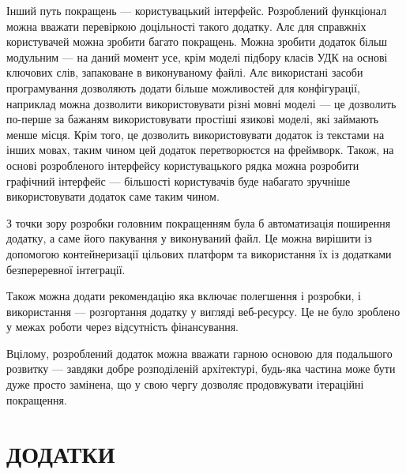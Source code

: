 \documentclass[14pt]{extarticle}
\let\oldsection\section
\renewcommand{\section}{\clearpage\oldsection}
\newcommand{\unnumberedSection}[1]{%
  \section*{#1}%
  \phantomsection
  \addcontentsline{toc}{section}{#1}%
}
\begin{document}
  Інший путь покращень --- користувацький інтерфейс.
  Розроблений функціонал можна вважати перевіркою доцільності такого додатку.
  Алє для справжніх користувачей можна зробити багато покращень.
  Можна зробити додаток більш модульним --- на даний момент усе,
  крім моделі підбору класів УДК на основі ключових слів,
  запаковане в виконуваному файлі.
  Алє використані засоби програмування дозволяють додати більше можливостей
  для конфігурації, наприклад можна дозволити використовувати різні мовні моделі
  --- це дозволить по-перше за бажаням використовувати простіші язикові моделі,
  які займають менше місця. Крім того,
  це дозволить використовувати додаток із текстами на інших мовах,
  таким чином цей додаток перетворюєтся на фреймворк.
  Також, на основі розробленого інтерфейсу користувацького рядка
  можна розробити графічний інтерфейс ---
  більшості користувачів буде набагато зручніше використовувати додаток
  саме таким чином.

  З точки зору розробки головним покращенням була б автоматизація
  поширення додатку, а саме його пакування у виконуваний файл.
  Це можна вирішити із допомогою контейнеризації цільових платформ
  та використання їх із додатками безпереревної інтеграції.

  Також можна додати рекомендацію яка включає полегшення і розробки,
  і використання --- розгортання додатку у вигляді веб-ресурсу.
  Це не було зроблено у межах роботи через відсутність фінансування.

  Вцілому, розроблений додаток можна вважати гарною
  основою для подальшого розвитку --- завдяки добре розподіленій архітектурі,
  будь-яка частина може бути дуже просто замінена,
  що у свою чергу дозволяє продовжувати ітераційні покращення.

  \printbibliography[heading=bibintoc, title=СПИСОК ВИКОРИСТАНОЇ ЛІТЕРАТУРИ]

  \unnumberedSection{ДОДАТКИ}
  
\end{document}
